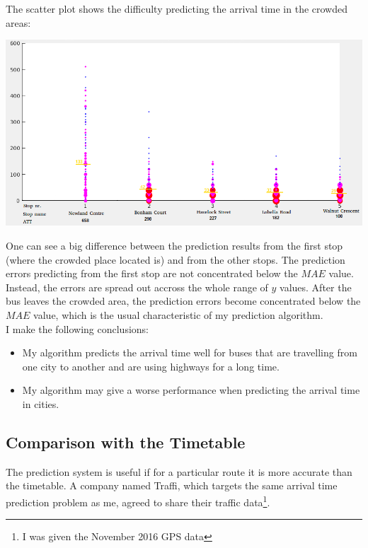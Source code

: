 \documentclass[12pt,a4paper,oneside,openright]{report}
\begin{document}
The scatter plot shows the difficulty predicting the arrival time in the crowded areas:

\includegraphics[width=\textwidth]{figs/worst_scatter_plot.png}

One can see a big difference between the prediction results from the first stop (where the
crowded place located is) and from the other stops. The prediction errors predicting from
the first stop are not concentrated below the $MAE$ value. Instead, the errors are spread out
accross the whole range of $y$ values. After the bus leaves the crowded area, the prediction
errors become concentrated below the $MAE$ value, which is the usual characteristic of my
prediction algorithm. \\

I make the following conclusions:

\begin{itemize}

    \item My algorithm predicts the arrival time well for buses that are travelling from one city
    to another and are using highways for a long time.

    \item My algorithm may give a worse performance when predicting the arrival time in cities.


\end{itemize}



\newpage

\subsection{Comparison with the Timetable}

The prediction system is useful if for a particular route it is more accurate than
the timetable. A company named Traffi, which targets the same arrival time prediction
problem as me, agreed to share their traffic
data\footnote{I was given the November 2016 GPS data}. \\
\end{document}
